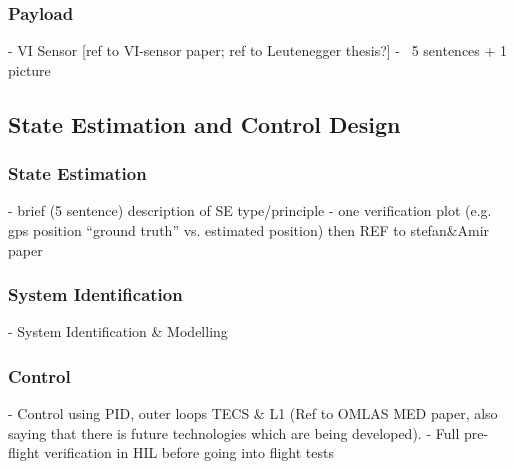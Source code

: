 \subsubsection{Payload}
  - VI Sensor [ref to VI-sensor paper; ref to Leutenegger thesis?]
  - ~5 sentences + 1 picture
  
\subsection{State Estimation and Control Design}

\subsubsection{State Estimation} \label{secsec:StateEstimation}
  - brief (5 sentence) description of SE type/principle
  - one verification plot (e.g. gps position ``ground truth'' vs. estimated position) 
  then REF to stefan\&Amir paper
  
\subsubsection{System Identification}
 - System Identification \& Modelling
 
 \subsubsection{Control}
 - Control using PID,  outer loops TECS \& L1 (Ref to OMLAS MED paper, also saying that there is future technologies which are being developed).
 - Full pre-flight verification in HIL before going into flight tests
 
